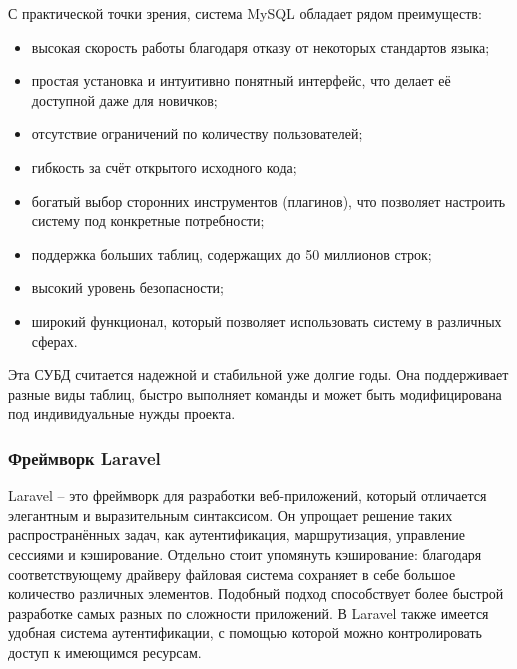 С практической точки зрения, система MySQL обладает рядом преимуществ:
\begin{itemize}
	\item высокая скорость работы благодаря отказу от некоторых стандартов языка;
	\item простая установка и интуитивно понятный интерфейс, что делает её доступной даже для новичков;
	\item отсутствие ограничений по количеству пользователей;
	\item гибкость за счёт открытого исходного кода;
	\item богатый выбор сторонних инструментов (плагинов), что позволяет настроить систему под конкретные потребности;
	\item поддержка больших таблиц, содержащих до 50 миллионов строк;
	\item высокий уровень безопасности;
	\item широкий функционал, который позволяет использовать систему в различных сферах.
\end{itemize}

Эта СУБД считается надежной и стабильной уже долгие годы. Она поддерживает разные виды таблиц, быстро выполняет команды и может быть модифицирована под индивидуальные нужды проекта.

\subsubsection{Фреймворк Laravel}

Laravel -- это фреймворк для разработки веб-приложений, который отличается элегантным и выразительным синтаксисом. Он упрощает решение таких распространённых задач, как аутентификация, маршрутизация, управление сессиями и кэширование. Отдельно стоит упомянуть кэширование: благодаря соответствующему драйверу файловая система сохраняет в себе большое количество различных элементов. Подобный подход способствует более быстрой разработке самых разных по сложности приложений. В Laravel  также имеется удобная система аутентификации, с помощью которой можно контролировать доступ к имеющимся ресурсам.

